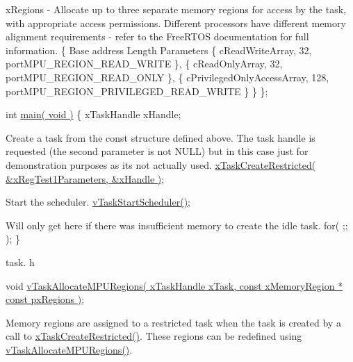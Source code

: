 \begin{DoxyPre}xRegions - Allocate up to three separate memory regions for access by
the task, with appropriate access permissions.  Different processors have
different memory alignment requirements - refer to the FreeRTOS documentation
for full information.
    \{                                           
Base address                    Length  Parameters
        \{ cReadWriteArray,              32,     portMPU\_REGION\_READ\_WRITE \},
        \{ cReadOnlyArray,               32,     portMPU\_REGION\_READ\_ONLY \},
        \{ cPrivilegedOnlyAccessArray,   128,    portMPU\_REGION\_PRIVILEGED\_READ\_WRITE \}
    \}
\};\end{DoxyPre}



\begin{DoxyPre}int \hyperlink{main_8c_ae66f6b31b5ad750f1fe042a706a4e3d4}{main( void )}
\{
xTaskHandle xHandle;\end{DoxyPre}



\begin{DoxyPre}Create a task from the const structure defined above.  The task handle
is requested (the second parameter is not NULL) but in this case just for
demonstration purposes as its not actually used.
    \hyperlink{task_8h_a61b00cd623953f4f94fe794057d7f648}{xTaskCreateRestricted( &xRegTest1Parameters, &xHandle )};\end{DoxyPre}



\begin{DoxyPre}Start the scheduler.
    \hyperlink{task_8h_aaf9dca1065c60abdeb309d56ab7293cb}{vTaskStartScheduler()};\end{DoxyPre}



\begin{DoxyPre}Will only get here if there was insufficient memory to create the idle
task.
    for( ;; );
\}
   \end{DoxyPre}


task. h 
\begin{DoxyPre}
 void \hyperlink{task_8h_a4fd3da9cc010ebb08743f613763c7924}{vTaskAllocateMPURegions( xTaskHandle xTask, const xMemoryRegion * const pxRegions )};\end{DoxyPre}


Memory regions are assigned to a restricted task when the task is created by a call to \hyperlink{task_8h_a61b00cd623953f4f94fe794057d7f648}{x\-Task\-Create\-Restricted()}. These regions can be redefined using \hyperlink{task_8h_a4fd3da9cc010ebb08743f613763c7924}{v\-Task\-Allocate\-M\-P\-U\-Regions()}.


